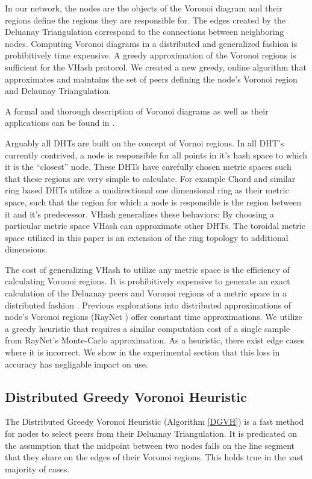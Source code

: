 \documentclass{IEEEtran}
\begin{document}
In our network, the nodes are the objects of the Voronoi diagram and their regions define the regions they are responsible for.  The edges created by the Deluanay Triangulation correspond to the connections between neighboring nodes.  Computing Voronoi diagrams in a distributed and generalized fashion is prohibitively time expensive.
A greedy approximation of the Voronoi regions is sufficient for the VHash protocol.
We created a new greedy, online algorithm that approximates and maintains the set of peers defining the node's Voronoi region and Delaunay Triangulation.




A formal and thorough description of Voronoi diagrams as well as their applications can be found in \cite{aurenhammer1991voronoi}.

Arguably all DHTs are built on the concept of Vornoi regions.
In all DHT's currently contrived, a node is responsible for all points in it's hash space to which it is the ``closest'' node.
These DHTs have carefully chosen metric spaces such that these regions are very simple to calculate.
For example Chord and similar ring based DHTs utilize a unidirectional one dimensional ring as their metric space, such that the region for which a node is responsible is the region between it and it's predecessor.
VHash generalizes these behaviors:
By choosing a particular metric space VHash can approximate other DHTs.
The toroidal metric space utilized in this paper is an extension of the ring topology to additional dimensions. 

The cost of generalizing VHash to utilize any metric space is the efficiency of calculating Voronoi regions. 
It is prohibitively expensive to generate an exact calculation of the Deluanay peers and Voronoi regions of a metric space in a distributed fashion \cite{raynet}.  %
Previous explorations into distributed approximations of node's Voronoi regions (RayNet \cite{raynet}) offer constant time approximations.
We utilize a greedy heuristic that requires a similar computation cost of a single sample from RayNet's Monte-Carlo approximation.
As a heuristic, there exist edge cases where it is incorrect.
We show in the experimental section that this loss in accuracy has negligable impact on use.

\subsection{Distributed Greedy Voronoi Heuristic}
The Distributed Greedy Voronoi Heuristic (Algorithm \ref{DGVH}) is a fast method for nodes to select peers from their Deluanay Triangulation.
It is predicated on the assumption that the midpoint between two nodes falls on the line segment that they share on the edges of their Voronoi regions.
This holds true in the vast majority of cases.
\end{document}
